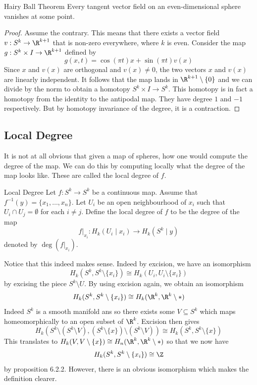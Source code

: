 \documentclass[a4paper]{article}
\begin{document}
\begin{thm}{Hairy Ball Theorem}{} Every tangent vector field on an even-dimensional sphere vanishes at some point. 
\begin{proof}
Assume the contrary. This means that there exists a vector field $v:S^k\to\R^{k+1}$ that is non-zero everywhere, where $k$ is even. Consider the map $g:S^k\times I\to\R^{k+1}$ defined by $$g(x,t)=\cos(\pi t)x+\sin(\pi t)v(x)$$ Since $x$ and $v(x)$ are orthogonal and $v(x)\neq 0$, the two vectors $x$ and $v(x)$ are linearly independent. It follows that the map lands in $\R^{k+1}\setminus\{0\}$ and we can divide by the norm to obtain a homotopy $S^k\times I\to S^k$. This homotopy is in fact a homotopy from the identity to the antipodal map. They have degree $1$ and $-1$ respectively. But by homotopy invariance of the degree, it is a contraction. 
\end{proof}
\end{thm}

\subsection{Local Degree}
It is not at all obvious that given a map of spheres, how one would compute the degree of the map. We can do this by computing locally what the degree of the map looks like. These are called the local degree of $f$. 

\begin{defn}{Local Degree}{} Let $f:S^k\to S^k$ be a continuous map. Assume that $f^{-1}(y)=\{x_1,\dots,x_n\}$. Let $U_i$ be an open neighbourhood of $x_i$ such that $U_i\cap U_j=\emptyset$ for each $i\neq j$. Define the local degree of $f$ to be the degree of the map $$f|_{x_i}:H_k(U_i\;|\;x_i)\to H_k(S^k\;|\;y)$$ denoted by $\deg(f|_{x_i})$. 
\end{defn}

Notice that this indeed makes sense. Indeed by excision, we have an isomorphism $$H_k(S^k,S^k\setminus\{x_i\})\cong H_k(U_i,U_i\setminus\{x_i\})$$ by excising the piece $S^k\setminus U$. By using excision again, we obtain an isomorphism $$H_k(S^k,S^k\setminus\{x_i\})\cong H_k(\R^k,\R^k\setminus\ast)$$ Indeed $S^k$ is a smooth manifold ans so there exists some $V\subseteq S^k$ which maps homeomorphically to an open subset of $\R^k$. Excision then gives $$H_k\left(S^k\setminus(S^k\setminus V),(S^k\setminus\{x\})\setminus(S^k\setminus V)\right)\cong H_k(S^k,S^k\setminus\{x\})$$ This translates to $H_k(V,V\setminus\{x\})\cong H_n(\R^k,\R^k\setminus\ast)$ so that we now have $$H_k(S^k,S^k\setminus\{x_i\})\cong\Z$$ by proposition 6.2.2. However, there is an obvious isomorphism which makes the definition clearer. 
\end{document}
